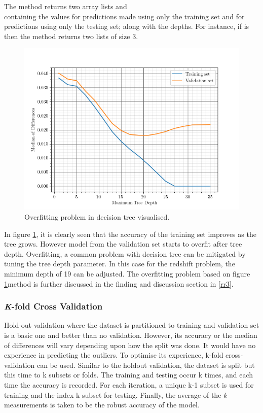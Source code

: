 The method returns two array lists  and\\  containing the  values for predictions made using only the training set and for predictions using only the testing set; along with the depths. For instance, if  is  then the method returns two lists of size 3.
\begin{figure}[H]
	\centering
	\includegraphics[width=\linewidth,keepaspectratio]{images/misc/ofit.png}
	\caption{Overfitting problem in decision tree visualised.}
	\label{fig:oft}
\end{figure}
In figure \ref{fig:oft}, it is clearly seen that the accuracy of the training set improves as the tree grows.  However model from the validation set starts to overfit after  tree depth. Overfitting, a common problem with decision tree can be mitigated by tuning the tree depth parameter. In this case for the redshift problem, the minimum depth of 19 can be adjusted. The overfitting problem based on figure \ref{fig:oft}method is further discussed in the finding and discussion section in \ref{rr3}.

\subsubsection{\textit{K}-fold Cross Validation}
Hold-out validation where the dataset is partitioned to training and validation set is a basic one and better than no validation. However, its accuracy or the median of differences will vary depending upon how the split was done. It would have no experience in predicting the outliers. To optimise its experience, k-fold cross-validation can be used. Similar to the holdout validation, the dataset is split but this time to k subsets or folds. The training and testing occur k times, and each time the accuracy is recorded. For each iteration, a unique k-1 subset is used for training and the index k subset for testing. Finally, the average of the \textit{k} measurements is taken to be the robust accuracy of the model.

